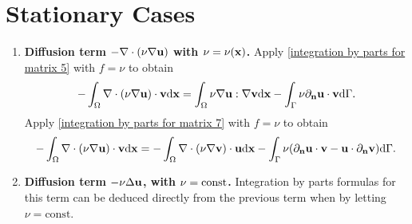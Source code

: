 \documentclass[oneside,11pt]{book}
\numberwithin{equation}{section}
\begin{document}
\section{Stationary Cases}
\label{ibp: stationary}
\begin{enumerate}[leftmargin=0mm]
    \item \textbf{Diffusion term $-\nabla\cdot(\nu\nabla{\bf u})$ with $\nu = \nu({\bf x})$.} Apply \eqref{integration by parts for matrix 5} with $f = \nu$ to obtain
    \begin{align*}
        -\int_\Omega \nabla\cdot(\nu\nabla{\bf u})\cdot{\bf v}{\rm d}{\bf x} = \int_\Omega \nu\nabla{\bf u}:\nabla{\bf v}{\rm d}{\bf x} - \int_\Gamma \nu\partial_{\bf n}{\bf u}\cdot{\bf v}{\rm d}\Gamma.
    \end{align*}
    Apply \eqref{integration by parts for matrix 7} with $f = \nu$ to obtain
    \begin{align*}
        -\int_\Omega \nabla\cdot(\nu\nabla{\bf u})\cdot{\bf v}{\rm d}{\bf x} = -\int_\Omega \nabla\cdot(\nu\nabla{\bf v})\cdot{\bf u}{\rm d}{\bf x} - \int_\Gamma \nu(\partial_{\bf n}{\bf u}\cdot{\bf v} - {\bf u}\cdot\partial_{\bf n}{\bf v}){\rm d}\Gamma.
    \end{align*}
    \item \textbf{Diffusion term $-\nu\Delta{\bf u}$, with $\nu = {\rm const}$.} Integration by parts formulas for this term can be deduced directly from the previous term when by letting $\nu = \mbox{const}$.
    

\end{enumerate}
\end{document}
